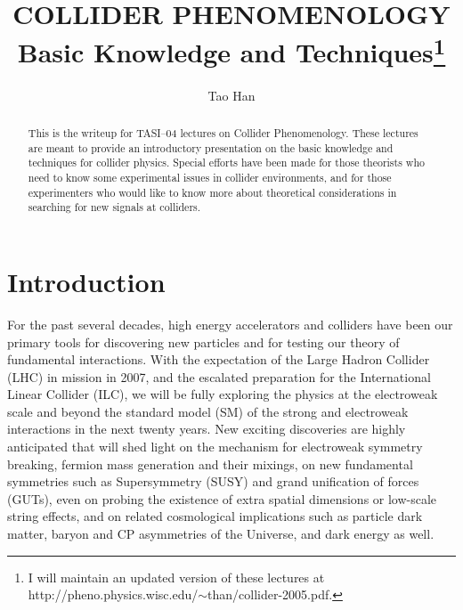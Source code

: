 \documentclass[12pt,prd,aps,floats,preprintnumbers,preprint,superscriptaddress,floatfix,nofootinbib]{revtex4}
\begin{document}
\vskip 1cm

\title{COLLIDER PHENOMENOLOGY\\
Basic Knowledge and Techniques\footnote{\raggedright I will maintain an updated 
version of these lectures at http://pheno.physics.wisc.edu/$\sim$than/collider-2005.pdf.}}

\author{ Tao Han }


\begin{abstract}
This is the writeup for TASI--04 lectures on Collider Phenomenology.
These lectures are meant to provide an introductory  presentation 
on the basic knowledge and techniques for collider physics.
Special efforts have been made  for  those 
theorists who need to know some experimental  issues in 
collider environments, 
and for those experimenters who would like to know more about 
theoretical considerations in searching for new signals at colliders. 
\end{abstract}

\maketitle


\tableofcontents

\section{Introduction}

For the past several decades, high energy accelerators and colliders 
have been our primary tools for discovering new particles and for testing 
our theory of fundamental interactions. With the
expectation of the Large Hadron Collider (LHC) in mission in 2007,
and the escalated preparation for the International Linear Collider (ILC),
we will be fully exploring the physics at the electroweak scale and beyond
the standard model (SM) of the strong and electroweak interactions 
in the next twenty years. New exciting discoveries are highly anticipated 
that will shed light on the mechanism for electroweak symmetry breaking,
fermion mass generation and their mixings, on new fundamental symmetries 
such as Supersymmetry (SUSY) and grand unification of forces (GUTs),
even on probing the existence of extra spatial dimensions
or low-scale string effects, and on related cosmological implications
such as particle dark matter, baryon and CP asymmetries of the
Universe, and dark energy as well.
\end{document}

